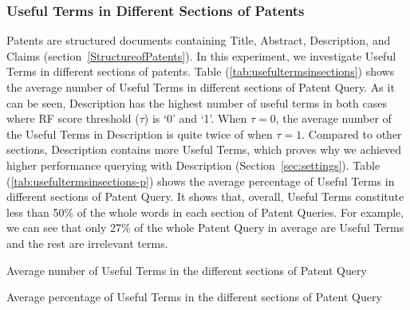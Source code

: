 \subsubsection{Useful Terms in Different Sections of Patents}
Patents are structured documents containing Title, Abstract, Description, and Claims (section~\ref{StructureofPatents}). In this experiment, we investigate Useful Terms in different sections of patents. 
Table (\ref{tab:usefultermsinsections}) shows the average number of Useful Terms in different sections of Patent Query.  
As it can be seen, Description has the highest number of useful terms in both cases where RF score threshold ($ \tau $) is `0' and `1'. When $ \tau = 0 $, the average number of the Useful Terms in Description is quite twice of when $ \tau = 1 $. Compared to other sections, Description contains more Useful Terms, which proves why we achieved higher performance querying with Description (Section~\ref{sec:settings}).
Table (\ref{tab:usefultermsinsections-p}) shows the average percentage of Useful Terms in different sections of Patent Query. It shows that, overall, Useful Terms constitute less than 50\% of the whole words in each section of Patent Queries. For example, we can see that only 27\% of the whole Patent Query in average are Useful Terms and the rest are irrelevant terms. 

\begin{table}[htpb]
  \begin{center}
   \caption{Average number of Useful Terms in the different sections of Patent Query}
     
  \label{tab:usefultermsinsections}
  \end{center}  
\end{table}
\begin{table}[htpb]
  \begin{center}
   \caption{Average percentage of Useful Terms in the different sections of Patent Query}
     
  \label{tab:usefultermsinsections-p}
  \end{center}  
\end{table}

